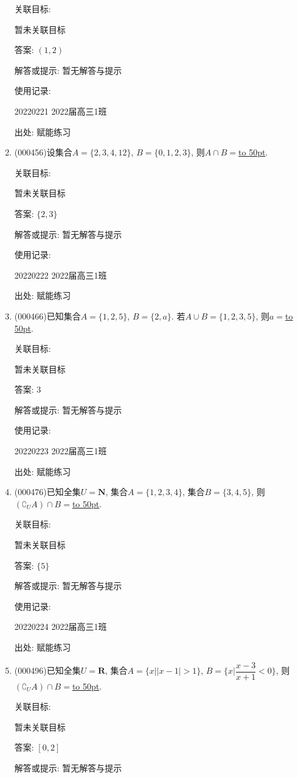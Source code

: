 \documentclass[10pt,a4paper]{article}
\newcommand{\blank}[1]{\underline{\hbox to #1pt{}}}
\begin{document}
\begin{enumerate}[1.]
关联目标:

暂未关联目标

答案: $(1,2)$

解答或提示: 暂无解答与提示

使用记录:

20220221	2022届高三1班	


出处: 赋能练习
\item { (000456)}设集合$A=\{2,3,4,12\}$, $B=\{0,1,2,3\}$, 则$A\cap B=$\blank{50}.


关联目标:

暂未关联目标

答案: $\{2,3\}$

解答或提示: 暂无解答与提示

使用记录:

20220222	2022届高三1班	


出处: 赋能练习
\item { (000466)}已知集合$A=\{1,2,5\}$, $B=\{2,a\}$. 若$A\cup B=\{1,2,3,5\}$, 则$a=$\blank{50}.


关联目标:

暂未关联目标

答案: $3$

解答或提示: 暂无解答与提示

使用记录:

20220223	2022届高三1班	


出处: 赋能练习
\item { (000476)}已知全集$U=\mathbf{N}$, 集合$A=\{1,2,3,4\}$, 集合$B=\{3,4,5\}$, 则$(\complement_U A)\cap B=$\blank{50}.


关联目标:

暂未关联目标

答案: $\{5\}$

解答或提示: 暂无解答与提示

使用记录:

20220224	2022届高三1班	


出处: 赋能练习
\item { (000496)}已知全集$U=\mathbf{R}$, 集合$A=\{x||x-1|>1\}$, $B=\{x|\dfrac{x-3}{x+1}<0\}$, 则$(\complement_U A)\cap B=$\blank{50}.


关联目标:

暂未关联目标

答案: $[0,2]$

解答或提示: 暂无解答与提示


\end{enumerate}
\end{document}
